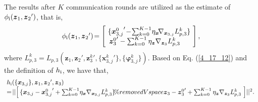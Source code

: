\documentclass[letterpaper]{article} %
\begin{document}
The results after $K$ communication rounds are utilized as the estimate of $\phi_{\rm{\uppercase\expandafter{\romannumeral1}}}({\boldsymbol{z}_1},{\boldsymbol{z}_2}')$, that is,
\begin{equation}
\begin{array}{l}
\label{4_17_12}
\phi_{\rm{\uppercase\expandafter{\romannumeral1}}}({\boldsymbol{z}_1},{\boldsymbol{z}_2}')
\! = \left[ \begin{array}{l}
  \! \{ {\boldsymbol{x}_{3,j}^{0}}' \!-\!\sum\nolimits_{k = 0}^{K-1} \! \eta_{\boldsymbol{x}} \! \nabla_{\boldsymbol{x}_{3,j}} L_{p,3}^k \} \! \\%

  {\boldsymbol{z}_3^{0}}'-\sum\nolimits_{k = 0}^{K-1}\eta_{\boldsymbol{z}} \nabla_{\boldsymbol{z}_3} L_{p,3}^k
\end{array} \right] ,
\end{array}
\end{equation}
where $L_{p,3}^k = L_{p,3}({\boldsymbol{z}_1},{\boldsymbol{z}_2}', {\boldsymbol{z}_3^k}', \{{\boldsymbol{x}_{3,j}^k}'\}, \{\boldsymbol{\varphi}_{3,j}^k\})$. Based on Eq. (\ref{4_17_12}) and the definition of $h_{\rm{\uppercase\expandafter{\romannumeral1}}}$, we have that,
\begin{equation}
\begin{array}{l}
\label{eq:5_8_9}
\!h_{\rm{\uppercase\expandafter{\romannumeral1}}}(\{{\boldsymbol{x}_{3,j}}\},\boldsymbol{z}_1, {\boldsymbol{z}_2}',\boldsymbol{z}_3 ) \\ \!=\! ||\! \left[ \! \begin{array}{l}
 \! \{ \boldsymbol{x}_{3,j} - {\boldsymbol{x}_{3,j}^{0}}'+\sum\nolimits_{k = 0}^{K-1} \!
 \eta_{\boldsymbol{x}} \nabla_{\boldsymbol{x}_{3,j}} L_{p,3}^k \} \!  \%removedVspace

  \boldsymbol{z}_3 - {\boldsymbol{z}_3^{0}}'+\sum\nolimits_{k = 0}^{K-1}\eta_{\boldsymbol{z}} \nabla_{\boldsymbol{z}_3} L_{p,3}^k
\end{array} \! \right] \! ||^2 .
\end{array}
\end{equation}
\end{document}
